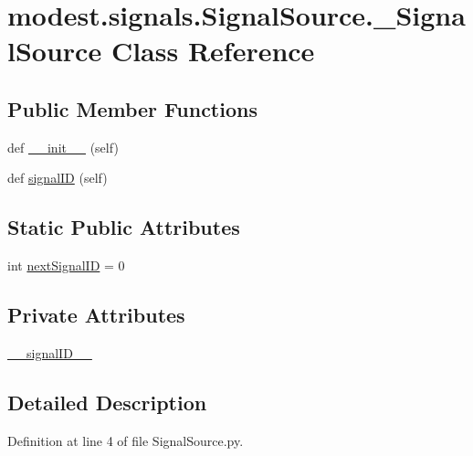 \hypertarget{classmodest_1_1signals_1_1SignalSource_1_1__SignalSource}{}\section{modest.\+signals.\+Signal\+Source.\+\_\+\+Signal\+Source Class Reference}
\label{classmodest_1_1signals_1_1SignalSource_1_1__SignalSource}
\subsection*{Public Member Functions}
\begin{DoxyCompactItemize}
\item 
def \hyperlink{classmodest_1_1signals_1_1SignalSource_1_1__SignalSource_a8ae495618e196b4271729d0c273d51f1}{\+\_\+\+\_\+init\+\_\+\+\_\+} (self)
\item 
def \hyperlink{classmodest_1_1signals_1_1SignalSource_1_1__SignalSource_aebd29b007288a1c40b26a3cd4dc06021}{signal\+ID} (self)
\end{DoxyCompactItemize}
\subsection*{Static Public Attributes}
\begin{DoxyCompactItemize}
\item 
int \hyperlink{classmodest_1_1signals_1_1SignalSource_1_1__SignalSource_abc8a46ab446416e7b72d27846c93f210}{next\+Signal\+ID} = 0
\end{DoxyCompactItemize}
\subsection*{Private Attributes}
\begin{DoxyCompactItemize}
\item 
\hyperlink{classmodest_1_1signals_1_1SignalSource_1_1__SignalSource_a7506c0b19a9c3c2774627ebd65a89234}{\+\_\+\+\_\+signal\+I\+D\+\_\+\+\_\+}
\end{DoxyCompactItemize}


\subsection{Detailed Description}


Definition at line 4 of file Signal\+Source.\+py.



